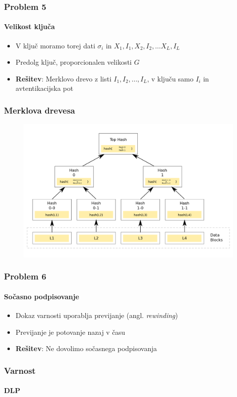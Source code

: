 \documentclass{beamer}    %
\begin{document}
\begin{frame}
    \frametitle{Problem 5}
    \framesubtitle{Velikost ključa}
    \begin{itemize}
        \item V ključ moramo torej dati $\sigma_i$ in $X_1, I_1, X_2, I_2, 
        \dots X_L, I_L$
        \item Predolg ključ, proporcionalen velikosti $G$
        \vspace{1cm}
        \item \textbf{Rešitev}: Merklovo drevo z listi $I_1, I_2, \dots, I_L$, 
            v ključu samo $I_i$ in avtentikacijska pot  
    \end{itemize}  
\end{frame}

\begin{frame}
    \frametitle{Merklova drevesa}
    \begin{figure}
        \includegraphics[width=\textwidth]{images/merkle-tree.png}
    \end{figure}
\end{frame}

\begin{frame}
    \frametitle{Problem 6}
    \framesubtitle{Sočasno podpisovanje}
    \begin{itemize}
        \item Dokaz varnosti uporablja previjanje (angl. \textit{rewinding})
        \item Previjanje je potovanje nazaj v času
        \vspace{1cm}
        \item \textbf{Rešitev}: Ne dovolimo sočasnega podpisovanja
    \end{itemize}
\end{frame}

\begin{frame}
    \frametitle{Varnost}
    \framesubtitle{DLP}
\end{frame}
\end{document}
